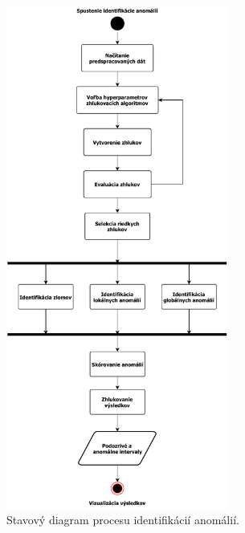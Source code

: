 \documentclass[a4paper,twoside,slovak,12pt,appendix]{article}
\begin{document}
\begin{figure}[]
  \centering
  \includegraphics[width=0.65\textwidth]{state_diagram.pdf}
  \caption{Stavový diagram procesu identifikácií anomálií.}
  \label{fig:state-diagram}
\end{figure}




\end{document}
